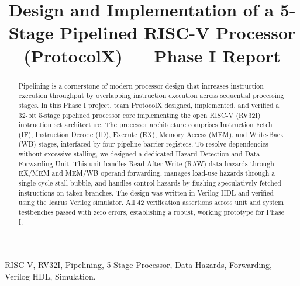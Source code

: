 \documentclass[conference]{IEEEtran}
\begin{document}
\title{Design and Implementation of a 5-Stage Pipelined RISC-V Processor (ProtocolX) --- Phase I Report}

\author{
\and
{}
\and
{}
\and
{}
\and
{}
}

\maketitle

\begin{abstract}
Pipelining is a cornerstone of modern processor design that increases instruction execution throughput by overlapping instruction execution across sequential processing stages. In this Phase I project, team ProtocolX designed, implemented, and verified a 32-bit 5-stage pipelined processor core implementing the open RISC-V (RV32I) instruction set architecture. The processor architecture comprises Instruction Fetch (IF), Instruction Decode (ID), Execute (EX), Memory Access (MEM), and Write-Back (WB) stages, interfaced by four pipeline barrier registers. To resolve dependencies without excessive stalling, we designed a dedicated Hazard Detection and Data Forwarding Unit. This unit handles Read-After-Write (RAW) data hazards through EX/MEM and MEM/WB operand forwarding, manages load-use hazards through a single-cycle stall bubble, and handles control hazards by flushing speculatively fetched instructions on taken branches. The design was written in Verilog HDL and verified using the Icarus Verilog simulator. All 42 verification assertions across unit and system testbenches passed with zero errors, establishing a robust, working prototype for Phase I.
\end{abstract}

\begin{IEEEkeywords}
RISC-V, RV32I, Pipelining, 5-Stage Processor, Data Hazards, Forwarding, Verilog HDL, Simulation.
\end{IEEEkeywords}
\end{document}
